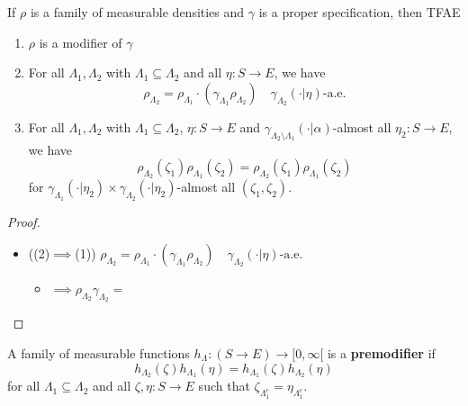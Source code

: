 \begin{proposition}
    \label{prop:modif-tfae}
    \leanok{}

    If $\rho$ is a family of measurable densities and $\gamma$ is a proper specification, then TFAE
    \begin{enumerate}
        \item $\rho$ is a modifier of $\gamma$
        \item For all $\Lambda_1, \Lambda_2$ with $\Lambda_1 \subseteq \Lambda_2$ and all $\eta : S \to E$, we have
        $$\rho_{\Lambda_2} = \rho_{\Lambda_1}\cdot (\gamma_{\Lambda_1} \rho_{\Lambda_2}) \quad \gamma_{\Lambda_2}(\cdot|\eta)\text{-a.e.}$$
        \item For all $\Lambda_1, \Lambda_2$ with $\Lambda_1 \subseteq \Lambda_2$, $\eta : S \to E$ and $\gamma_{\Lambda_2 \setminus \Lambda_1}(\cdot|\alpha)$-almost all $\eta_2 : S \to E$, we have
        $$\rho_{\Lambda_2}(\zeta_1)\rho_{\Lambda_1}(\zeta_2) = \rho_{\Lambda_2}(\zeta_1) \rho_{\Lambda_1}(\zeta_2)$$
        for $\gamma_{\Lambda_1}(\cdot|\eta_2) \times \gamma_{\Lambda_2}(\cdot|\eta_2)$-almost all $(\zeta_1, \zeta_2)$.
    \end{enumerate}
\end{proposition}
\begin{proof}

    \begin{itemize}
        \item ((2)$\implies$(1)) $\rho_{\Lambda_2} = \rho_{\Lambda_1}\cdot (\gamma_{\Lambda_1} \rho_{\Lambda_2}) \quad \gamma_{\Lambda_2}(\cdot|\eta)\text{-a.e.}$
        \begin{itemize}
            \item $\implies \rho_{\Lambda_2}\gamma_{\Lambda_2} = $
        \end{itemize}
    \end{itemize}

\end{proof}

\begin{definition}
    \label{def:premodif}
    \uses{}
    \leanok

    A family of measurable functions $h_\Lambda : (S \to E) \to [0, \infty[$ is a {\bf premodifier} if
    $$h_{\Lambda_2}(\zeta)h_{\Lambda_1}(\eta) = h_{\Lambda_1}(\zeta)h_{\Lambda_2}(\eta)$$
    for all $\Lambda_1 \subseteq \Lambda_2$ and all $\zeta, \eta : S \to E$ such that $\zeta_{\Lambda_1^c} = \eta_{\Lambda_1^c}$.
\end{definition}

